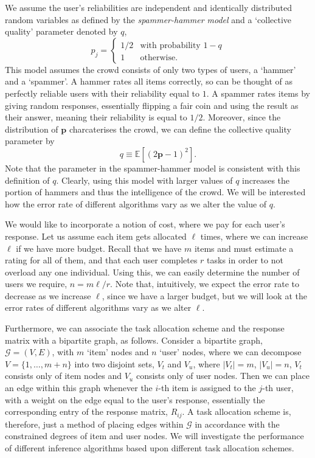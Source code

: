 \documentclass[12pt]{article}
\numberwithin{equation}{section}
\begin{document}
We assume the user's reliabilities are independent and identically distributed random variables as defined by the \textit{spammer-hammer model} and a `collective quality' parameter denoted by $q$,
\begin{equation*}
	p_{j} =
	\begin{cases}
		1/2 & \text{with probability } 1-q\\
		1 & \text{otherwise}.
	\end{cases}
\end{equation*}
This model assumes the crowd consists of only two types of users, a `hammer' and a `spammer'. A hammer rates all items correctly, so can be thought of as perfectly reliable users with their reliability equal to $1$. A spammer rates items by giving random responses, essentially flipping a fair coin and using the result as their answer, meaning their reliability is equal to $1/2$.  Moreover, since the distribution of $\mathbf{p}$ charcaterises the crowd, we can define the collective quality parameter by
\begin{equation*}
	q \equiv \mathbb{E}[(2\mathbf{p}-1)^{2}].
\end{equation*}
Note that the parameter in the spammer-hammer model is consistent with this definition of $q$.
Clearly, using this model with larger values of $q$ increases the portion of hammers and thus the intelligence of the crowd. We will be interested how the error rate of different algorithms vary as we alter the value of $q$.

We would like to incorporate a notion of cost, where we pay for each user's response. Let us assume each item gets allocated $\ell$ times, where we can increase $\ell$ if we have more budget. Recall that we have $m$ items and must estimate a rating for all of them, and that each user completes $r$ tasks in order to not overload any one individual. Using this, we can easily determine the number of users we require, $n = m\ell/r$. Note that, intuitively, we expect the error rate to decrease as we increase $\ell$, since we have a larger budget, but we will look at the error rates of different algorithms vary as we alter $\ell$.

Furthermore, we can associate the task allocation scheme and the response matrix with a bipartite graph, as follows. Consider a bipartite graph, $\mathcal{G} = (V,E)$, with $m$ `item' nodes and $n$ `user' nodes, where we can decompose $V=\{1,\dots,m+n\}$ into two disjoint sets, $V_{t}$ and $V_{u}$, where $\left\vert{V_{t}}\right\vert = m$, $\left\vert{V_{u}}\right\vert = n$, $V_{t}$ consists only of item nodes and $V_{u}$ consists only of user nodes. Then we can place an edge within this graph whenever the $i$-th item is assigned to the $j$-th user, with a weight on the edge equal to the user's response, essentially the corresponding entry of the response matrix, $R_{ij}$. A task allocation scheme is, therefore, just a method of placing edges within $\mathcal{G}$ in accordance with the constrained degrees of item and user nodes. We will investigate the performance of different inference algorithms based upon different task allocation schemes.
\end{document}
